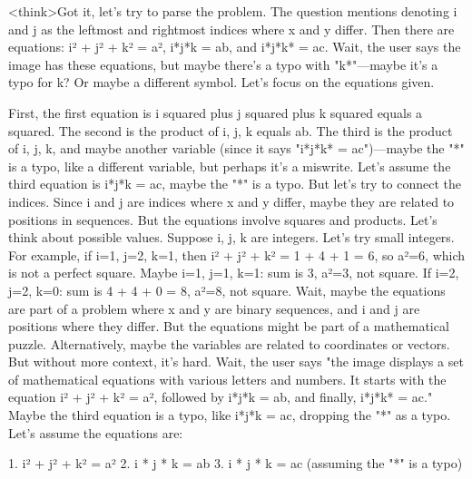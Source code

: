 <think>Got it, let's try to parse the problem. The question mentions denoting i and j as the leftmost and rightmost indices where x and y differ. Then there are equations: i² + j² + k² = a², i*j*k = ab, and i*j*k* = ac. Wait, the user says the image has these equations, but maybe there's a typo with "k*"—maybe it's a typo for k? Or maybe a different symbol. Let's focus on the equations given.

First, the first equation is i squared plus j squared plus k squared equals a squared. The second is the product of i, j, k equals ab. The third is the product of i, j, k, and maybe another variable (since it says "i*j*k* = ac")—maybe the "*" is a typo, like a different variable, but perhaps it's a miswrite. Let's assume the third equation is i*j*k = ac, maybe the "*" is a typo. But let's try to connect the indices. Since i and j are indices where x and y differ, maybe they are related to positions in sequences. But the equations involve squares and products. Let's think about possible values. Suppose i, j, k are integers. Let's try small integers. For example, if i=1, j=2, k=1, then i² + j² + k² = 1 + 4 + 1 = 6, so a²=6, which is not a perfect square. Maybe i=1, j=1, k=1: sum is 3, a²=3, not square. If i=2, j=2, k=0: sum is 4 + 4 + 0 = 8, a²=8, not square. Wait, maybe the equations are part of a problem where x and y are binary sequences, and i and j are positions where they differ. But the equations might be part of a mathematical puzzle. Alternatively, maybe the variables are related to coordinates or vectors. But without more context, it's hard. Wait, the user says "the image displays a set of mathematical equations with various letters and numbers. It starts with the equation i² + j² + k² = a², followed by i*j*k = ab, and finally, i*j*k* = ac." Maybe the third equation is a typo, like i*j*k = ac, dropping the "*" as a typo. Let's assume the equations are:

1. i² + j² + k² = a²
2. i * j * k = ab
3. i * j * k = ac (assuming the "*" is a typo)

